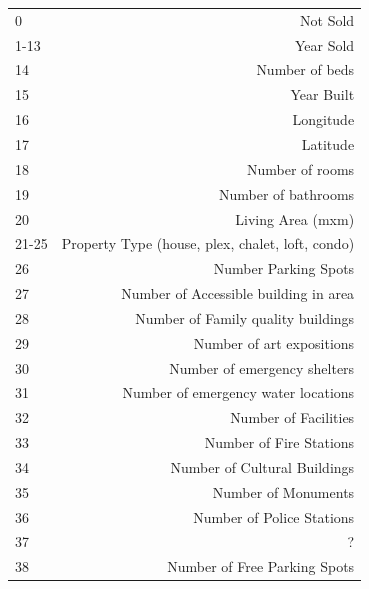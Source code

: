 \documentclass{acm_proc_article-sp}
\begin{document}
\begin{tabular}{ l | r }
  0 & Not Sold \\
  1-13 & Year Sold \\
  14 & Number of beds \\
  15 & Year Built\\
  16 & Longitude\\
  17 & Latitude\\
  18 & Number of rooms\\
  19 & Number of bathrooms\\
  20 & Living Area (mxm)\\
  21-25 & Property Type (house, plex, chalet, loft, condo)\\
  26 & Number Parking Spots\\
  27 & Number of Accessible building in area\\
  28 & Number of Family quality buildings\\
  29 & Number of art expositions\\
  30 & Number of emergency shelters\\
  31 & Number of emergency water locations\\
  32 & Number of Facilities\\
  33 & Number of Fire Stations\\
  34 & Number of Cultural Buildings\\
  35 & Number of Monuments\\
  36 & Number of Police Stations\\
  37 & ?\\
  38 & Number of Free Parking Spots\\
\end{tabular}
\end{document}
